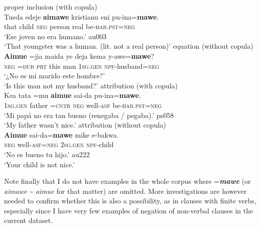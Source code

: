 \documentclass[output=paper]{langsci/langscibook}
\begin{document}
\begin{exe}\ex
\label{ex:tacana-inhuman-husband} \begin{xlist}
\ex\label{ex:tacana-inhuman}
proper inclusion (with copula)\\
\gll {}Tueda  edeje{\cb} \textbf{aimawe}  kristianu eni{\cb} pu-ina=\textbf{mawe}.\\
 that  child  \textsc{neg}  person  real  be-\textsc{hab.pst=neg}\\
\glt `Ese joven no era humano.' au003\\
`That youngster was a human. (lit. not a real person)'
\ex\label{ex:tacana-husband}
equation (without copula)\\
\gll  \textbf{Aimue}  =jia  maida ye  deja{\cb} kema y-awe{\cb}=\textbf{mawe}?\\
 \textsc{neg}  =\textsc{dub}  \textsc{prt}  this  man  \textsc{1sg.gen}
 \textsc{npf}-husband=\textsc{neg}\\
\glt `¿No es mi marido este hombre?'
\parencite[4]{Ottaviano1989}\\
`Is this man not my husband?' 
\ex\label{ex:tacana-nice}  attribution (with copula)\\
\gll {}Kea tata{\cb} =mu \textbf{aimue} sai-da pu-ina=\textbf{mawe}.\\
    \textsc{1sg.gen}  father  =\textsc{cntr}  \textsc{neg}
    well\textsc{-asf}  be-\textsc{hab.pst=neg}\\
\glt `Mi papá no era tan bueno (renegaba \slash{}  pegaba).' ps058\\
`My father wasn't nice.' 
 \ex\label{ex:tacana-child}  attribution (without copula)\\
\gll 
    \textbf{Aimue} sai-da=\textbf{mawe} mike e-bakwa{\cb}.\\
    \textsc{neg}  well-\textsc{asf=neg}  \textsc{2sg.gen}
    \textsc{npf}-child\\
\glt `No es bueno tu hijo.' au222\\
`Your child is not nice.' 
\end{xlist}\end{exe}

Note finally that I do not have examples in the whole corpus where
=\textbf{\textit{mawe}} (or \textit{aimawe} {\textasciitilde}
\textit{aimue} for that matter) are omitted. More investigations are
however needed to confirm whether this is also a possibility, as in clauses
with finite verbs, especially since I have very few examples of negation of
non-verbal clauses in the current dataset.
\end{document}
